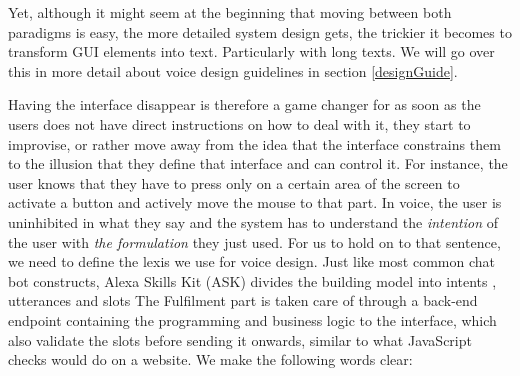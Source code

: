 Yet, although it might seem at the beginning that moving between both paradigms is easy, the more detailed system design gets, the trickier it becomes to transform GUI elements into text. Particularly with long texts. We will go over this in more detail about voice design guidelines in section \ref{designGuide}.

Having the interface disappear is therefore a game changer for as soon as the users does not have direct instructions on how to deal with it, they start to improvise, or rather move away from the idea that the interface constrains them to the illusion that they define that interface and can control it. For instance, the user knows that they have to press only on a certain area of the screen to activate a button and actively move the mouse to that part. In voice, the user is uninhibited in what they say and the system has to understand the \textit{intention}%
of the user with \textit{the formulation}%
 they just used. 
For us to hold on to that sentence, we need to define the lexis we use for voice design. 
Just like most common chat bot constructs, Alexa Skills Kit (ASK) divides the building model into intents%
, utterances%
and slots %
The Fulfilment part is taken care of through a back-end endpoint containing the programming and business logic to the interface, which also validate the slots before sending it onwards, similar to what JavaScript checks would do on a website. We make the following words clear:


